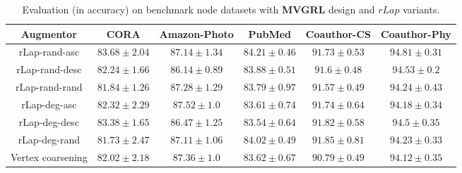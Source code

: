 \documentclass{article}
\theoremstyle{plain}
\theoremstyle{definition}
\theoremstyle{remark}
\begin{document}
\begin{table*}[ht!]
\centering
\caption{Evaluation (in accuracy) on benchmark node datasets with \textbf{MVGRL} design and $rLap$ variants.}
\label{table:rlap_ablation_mvgrl}
\vskip 0.15in
\begin{center}
\begin{small}
\begin{sc}
\begin{tabular}{c|c|c|c|c|c}
\toprule
Augmentor & CORA & Amazon-Photo & PubMed & Coauthor-CS & Coauthor-Phy \\
\midrule
rLap-rand-asc & $\mathbf{83.68 \pm 2.04}$ & $87.14 \pm 1.34$ &  $\mathbf{84.21 \pm 0.46}$ &  $91.73 \pm 0.53$ & $\mathbf{94.81 \pm 0.31}$ \\
rLap-rand-desc & $82.24 \pm 1.66$ & $86.14 \pm 0.89$  & $83.88 \pm 0.51$ & $91.6 \pm 0.48$ & \underline{$94.53 \pm 0.2$}  \\
rLap-rand-rand & $81.84 \pm 1.26$ & $87.28 \pm 1.29$ &  $83.79 \pm 0.97$  &  $91.57 \pm 0.49$ & $94.24 \pm 0.43$ \\
rLap-deg-asc & $82.32 \pm 2.29$ &  $\mathbf{87.52 \pm 1.0}$ & $83.61 \pm 0.74$ & $91.74 \pm 0.64$ & $94.18 \pm 0.34$  \\
rLap-deg-desc & \underline{$83.38 \pm 1.65$} & $86.47 \pm 1.25$ & $83.54 \pm 0.64$ & \underline{$91.82 \pm 0.58$}  & $94.5 \pm 0.35$  \\
rLap-deg-rand & $81.73 \pm 2.47$ & $87.11 \pm 1.06$ & \underline{$84.02 \pm 0.49$} & $\mathbf{91.85 \pm 0.81}$ & $94.23 \pm 0.33$  \\
Vertex coarsening & $82.02 \pm 2.18$ &  \underline{$87.36 \pm 1.0$} & $83.62 \pm 0.67$ & $90.79 \pm 0.49$ & $94.12 \pm 0.35$ \\
\bottomrule
\end{tabular}
\end{sc}
\end{small}
\end{center}
\vskip -0.1in
\end{table*}
\end{document}
